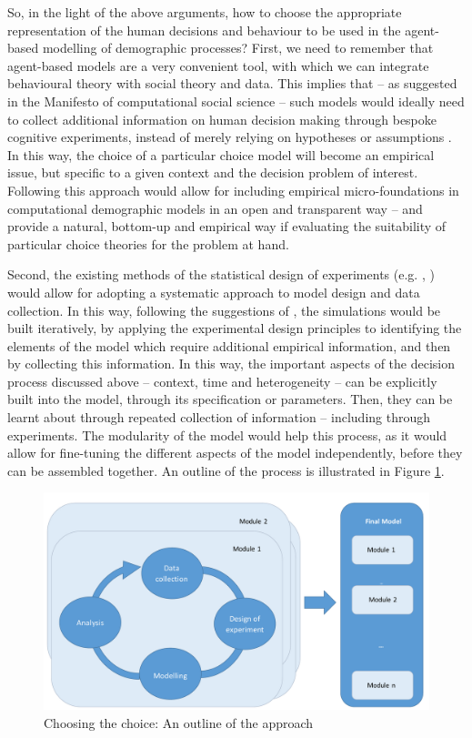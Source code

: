 \documentclass{article}
\begin{document}
So, in the light of the above arguments, how to choose the appropriate representation of the human decisions and behaviour to be used in the agent-based modelling of demographic processes? First, we need to remember that agent-based models are a very convenient tool, with which we can integrate behavioural theory with social theory and data. This implies that – as suggested in the Manifesto of computational social science \citep{Conte} – such models would ideally need to collect additional information on human decision making through bespoke cognitive experiments, instead of merely relying on hypotheses or assumptions \citep{Courgeau}. In this way, the choice of a particular choice model will become an empirical issue, but specific to a given context and the decision problem of interest. Following this approach would allow for including empirical micro-foundations in computational demographic models in an open and transparent way – and provide a natural, bottom-up and empirical way if evaluating the suitability of particular choice theories for the problem at hand.

Second, the existing methods of the statistical design of experiments (e.g. \citeauthor{Chaloner} \citeyear{Chaloner}, \citeauthor{Kleijnen2000} \citeyear{Kleijnen2000}) would allow for adopting a systematic approach to model design and data collection. In this way, following the suggestions of \citet{Courgeau}, the simulations would be built iteratively, by applying the experimental design principles to identifying the elements of the model which require additional empirical information, and then by collecting this information.  In this way, the important aspects of the decision process discussed above – context, time and heterogeneity – can be explicitly built into the model, through its specification or parameters. Then, they can be learnt about through repeated collection of information – including through experiments. The modularity of the model would help this process, as it would allow for fine-tuning the different aspects of the model independently, before they can be assembled together. An outline of the process is illustrated in Figure \ref{fig:approach}.

\begin{figure}
\includegraphics[width=\textwidth]{process}
\caption{Choosing the choice: An outline of the approach \label{fig:approach}}
\end{figure}
\end{document}

